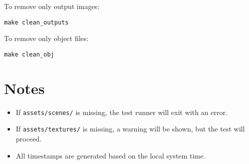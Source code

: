 \documentclass[11pt]{article}
\begin{document}
To remove only output images:

\begin{lstlisting}
make clean_outputs
\end{lstlisting}

To remove only object files:

\begin{lstlisting}
make clean_obj
\end{lstlisting}

\section*{Notes}
\begin{itemize}
    \item If \texttt{assets/scenes/} is missing, the test runner will exit with an error.
    \item If \texttt{assets/textures/} is missing, a warning will be shown, but the test will proceed.
    \item All timestamps are generated based on the local system time.
\end{itemize}
\end{document}
